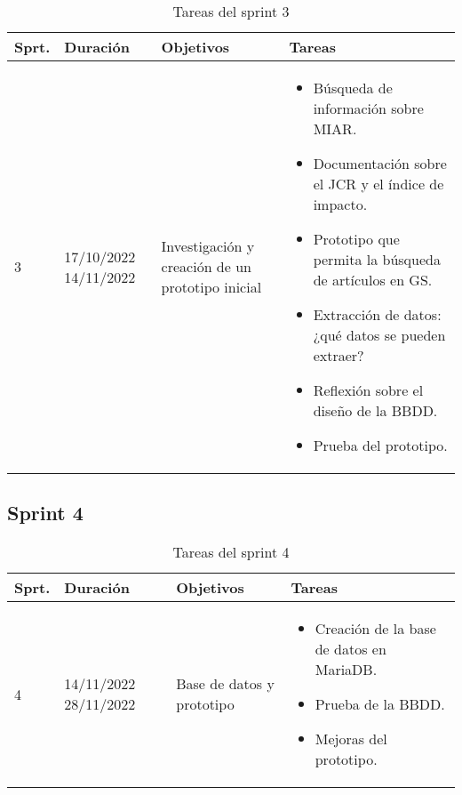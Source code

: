 \begin{table}[h]
\centering
\begin{tabularx}{\textwidth}{llll}
\toprule
\textbf{Sprt.} & \textbf{Duración} & \textbf{Objetivos} & \textbf{Tareas}\\
\midrule
3 & \parbox{55}{17/10/2022 14/11/2022} & \parbox{80}{Investigación y creación de un prototipo inicial} & \parbox{150}{\begin{itemize}\item Búsqueda de información sobre MIAR. \item Documentación sobre el JCR y el índice de impacto. \item Prototipo que permita la búsqueda de artículos en GS. \item Extracción de datos: ¿qué datos se pueden extraer? \item Reflexión sobre el diseño de la BBDD. \item Prueba del prototipo.\end{itemize}}\\
\bottomrule
\end{tabularx}
\caption{Tareas del sprint 3}
\label{tab:sprint3}
\end{table}


\subsection{Sprint 4}
\begin{table}[h]
\centering
\begin{tabularx}{\textwidth}{llll}
\toprule
\textbf{Sprt.} & \textbf{Duración} & \textbf{Objetivos} & \textbf{Tareas}\\
\midrule
    4 & \parbox{55}{14/11/2022 28/11/2022} & \parbox{80}{Base de datos y prototipo} & \parbox{150}{\begin{itemize}\item Creación de la base de datos en MariaDB. \item Prueba de la BBDD. \item Mejoras del prototipo.\end{itemize}}\\
\bottomrule
\end{tabularx}
\caption{Tareas del sprint 4}
\label{tab:sprint4}
\end{table}


